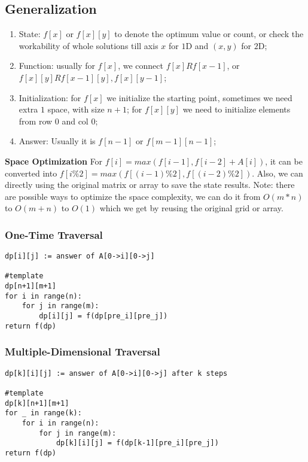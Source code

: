 \documentclass[../main.tex]{subfiles}
\begin{document}
\subsection{Generalization}
\begin{enumerate}
    \item State: $f[x]$ or $f[x][y]$ to denote the optimum value or count, or check the workability of whole solutions till axis $x$ for $1$D and $(x,y)$ for $2$D;  
    \item Function: usually for $f[x]$, we connect $f[x]R f[x-1]$, or $f[x][y] R f[x-1][y], f[x][y-1]$;   
    \item Initialization: for $f[x]$ we initialize the starting point, sometimes we need extra $1$ space, with size $n+1$;  for $f[x][y]$ we need to initialize elements from row $0$ and col $0$;
    \item Answer: Usually it is $f[n-1]$ or $f[m-1][n-1]$; 
\end{enumerate}
\textbf{Space Optimization} For $f[i] = max(f[i-1], f[i-2] + A[i])$, it can be converted into $f[i\%2] = max(f[(i-1)\%2], f[(i-2)\%2])$. Also, we can directly using the original matrix or array to save the state results.  Note: there are possible ways to optimize the space complexity, we can do it from $O(m*n)$ to $O(m+n)$ to $O(1)$ which we get by reusing the original grid or array.
\subsubsection{One-Time Traversal}
\begin{lstlisting}
dp[i][j] := answer of A[0->i][0->j]

#template
dp[n+1][m+1]
for i in range(n):
    for j in range(m):
        dp[i][j] = f(dp[pre_i][pre_j])
return f(dp)
\end{lstlisting}

\subsubsection{Multiple-Dimensional Traversal}
\begin{lstlisting}
dp[k][i][j] := answer of A[0->i][0->j] after k steps

#template
dp[k][n+1][m+1]
for _ in range(k):
    for i in range(n):
        for j in range(m):
            dp[k][i][j] = f(dp[k-1][pre_i][pre_j])
return f(dp)
\end{lstlisting}
\end{document}
